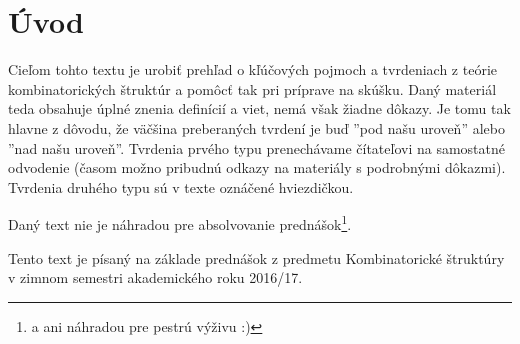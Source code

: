 \setcounter{chapter}{-1}
\chapter{Úvod}

Cieľom tohto textu je urobiť prehľad o kľúčových pojmoch a tvrdeniach z teórie kombinatorických štruktúr a pomôcť tak pri príprave na skúšku. 
Daný materiál teda obsahuje úplné znenia definícií a viet, nemá však žiadne dôkazy. Je tomu tak hlavne z dôvodu, že väčšina preberaných
tvrdení je buď ''pod našu uroveň'' alebo ''nad našu uroveň''. Tvrdenia prvého typu prenechávame čítateľovi na samostatné odvodenie (časom možno pribudnú odkazy
na materiály s podrobnými dôkazmi). Tvrdenia druhého typu sú v texte oznáčené hviezdičkou.

Daný text nie je náhradou pre absolvovanie prednášok\footnote{a ani náhradou pre pestrú výživu :)}.

Tento text je písaný na základe prednášok z predmetu Kombinatorické štruktúry v zimnom semestri akademického roku 2016/17.
